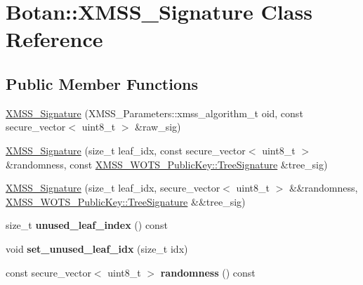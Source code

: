 \hypertarget{class_botan_1_1_x_m_s_s___signature}{}\section{Botan\+:\+:X\+M\+S\+S\+\_\+\+Signature Class Reference}
\label{class_botan_1_1_x_m_s_s___signature}
\subsection*{Public Member Functions}
\begin{DoxyCompactItemize}
\item 
\mbox{\hyperlink{class_botan_1_1_x_m_s_s___signature_ad35df28bc61392baa698ce09e9eae178}{X\+M\+S\+S\+\_\+\+Signature}} (X\+M\+S\+S\+\_\+\+Parameters\+::xmss\+\_\+algorithm\+\_\+t oid, const secure\+\_\+vector$<$ uint8\+\_\+t $>$ \&raw\+\_\+sig)
\item 
\mbox{\hyperlink{class_botan_1_1_x_m_s_s___signature_afbb39a370a908d6ccb83554b1375c08a}{X\+M\+S\+S\+\_\+\+Signature}} (size\+\_\+t leaf\+\_\+idx, const secure\+\_\+vector$<$ uint8\+\_\+t $>$ \&randomness, const \mbox{\hyperlink{class_botan_1_1_x_m_s_s___w_o_t_s___public_key_1_1_tree_signature}{X\+M\+S\+S\+\_\+\+W\+O\+T\+S\+\_\+\+Public\+Key\+::\+Tree\+Signature}} \&tree\+\_\+sig)
\item 
\mbox{\hyperlink{class_botan_1_1_x_m_s_s___signature_a99f8f0a75e4d662beb7b0936d7d9b5c8}{X\+M\+S\+S\+\_\+\+Signature}} (size\+\_\+t leaf\+\_\+idx, secure\+\_\+vector$<$ uint8\+\_\+t $>$ \&\&randomness, \mbox{\hyperlink{class_botan_1_1_x_m_s_s___w_o_t_s___public_key_1_1_tree_signature}{X\+M\+S\+S\+\_\+\+W\+O\+T\+S\+\_\+\+Public\+Key\+::\+Tree\+Signature}} \&\&tree\+\_\+sig)
\item 
\mbox{\label{class_botan_1_1_x_m_s_s___signature_a806647cfcd64bedbe2130336c2efa17c}} 
size\+\_\+t {\bfseries unused\+\_\+leaf\+\_\+index} () const
\item 
\mbox{\label{class_botan_1_1_x_m_s_s___signature_a15c7ba96d7ca6113a65c86318d7943d3}} 
void {\bfseries set\+\_\+unused\+\_\+leaf\+\_\+idx} (size\+\_\+t idx)
\item 
\mbox{\label{class_botan_1_1_x_m_s_s___signature_acdd47e11c1329a033643de9eb90a1280}} 
const secure\+\_\+vector$<$ uint8\+\_\+t $>$ {\bfseries randomness} () const

\end{DoxyCompactItemize}
